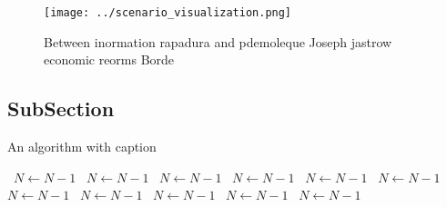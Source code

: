\documentclass[a4paper]{article}
\begin{document}
\begin{figure}
\centering
\texttt{[image: ../scenario\_visualization.png]}
\caption{Between inormation rapadura and pdemoleque Joseph jastrow economic reorms Borde
}
\end{figure}
 
\subsection{SubSection}

\begin{algorithm}
\caption{An algorithm with caption}
\begin{algorithmic}
\    \State $N \gets N - 1$
\    \State $N \gets N - 1$
\    \State $N \gets N - 1$
\    \State $N \gets N - 1$
\    \State $N \gets N - 1$
\    \State $N \gets N - 1$
\    \State $N \gets N - 1$
\    \State $N \gets N - 1$
\    \State $N \gets N - 1$
\    \State $N \gets N - 1$
\    \State $N \gets N - 1$
\EndWhile
\end{algorithmic}
\end{algorithm}
\end{document}
